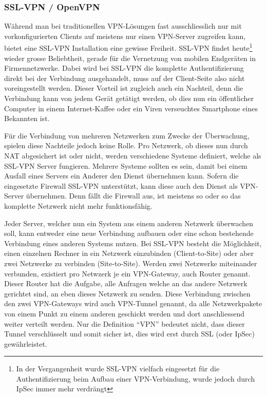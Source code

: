 \subsubsection{SSL-VPN / OpenVPN} \label{sec:theorie-nat-fazit-sslvpn}     
W\"ahrend man bei traditionellen VPN-L\"osungen fast ausschliesslich nur mit vorkonfigurierten Clients auf meistens nur einen VPN-Server zugreifen kann, bietet eine SSL-VPN Installation eine gewisse Freiheit. SSL-VPN findet heute\footnote{\label{foot:sslvpn-past}In der Vergangenheit wurde SSL-VPN vielfach eingesetzt f\"ur die Authentifizierung beim Aufbau einer VPN-Verbindung, wurde jedoch durch IpSec immer mehr verdr\"angt} wieder grosse Beliebtheit, gerade f\"ur die Vernetzung von mobilen Endger\"aten in Firmennetzwerke. Dabei wird bei SSL-VPN die komplette Authentifizierung direkt bei der Verbindung ausgehandelt, muss auf der Client-Seite also nicht voreingestellt werden. Dieser Vorteil ist zugleich auch ein Nachteil, denn die Verbindung kann von jedem Ger\"at get\"atigt werden, ob dies nun ein \"offentlicher Computer in einem Internet-Kaffee oder ein Viren verseuchtes Smartphone eines Bekannten ist.

F\"ur die Verbindung von mehreren Netzwerken zum Zwecke der \"Uberwachung, spielen diese Nachteile jedoch keine Rolle. Pro Netzwerk, ob dieses nun durch NAT abgesichert ist oder nicht, werden verschiedene Systeme definiert, welche als SSL-VPN Server fungieren. Mehrere Systeme sollten es sein, damit bei einem Ausfall eines Servers ein Anderer den Dienst \"ubernehmen kann. Sofern die eingesetzte Firewall SSL-VPN unterst\"utzt, kann  diese auch den Dienst als VPN-Server \"ubernehmen. Denn f\"allt die Firewall aus, ist meistens so oder so das komplette Netzwerk nicht mehr funktionsf\"ahig.

Jeder Server, welcher nun ein System aus einem anderen Netzwerk \"uberwachen soll, kann entweder eine neue Verbindung aufbauen oder eine schon bestehende Verbindung eines anderen Systems nutzen. Bei SSL-VPN besteht die M\"oglichkeit, einen einzelnen Rechner in ein Netzwerk einzubinden (Client-to-Site) oder aber zwei Netzwerke zu verbinden (Site-to-Site). Werden zwei Netzwerke miteinander verbunden, existiert pro Netwzerk je ein VPN-Gateway, auch Router genannt. Dieser Router hat die Aufgabe, alle Anfragen welche an das andere Netzwerk gerichtet sind, an eben dieses Netzwerk zu senden. Diese Verbindung zwischen den zwei VPN-Gateways wird auch VPN-Tunnel genannt, da alle Netzwerkpakete von einem Punkt zu einem anderen geschickt werden und dort anschliessend weiter verteilt werden. Nur die Definition "`VPN"' bedeutet nicht, dass dieser Tunnel verschl\"usselt und somit sicher ist, dies wird erst durch SSL (oder IpSec) gew\"ahrleistet.

